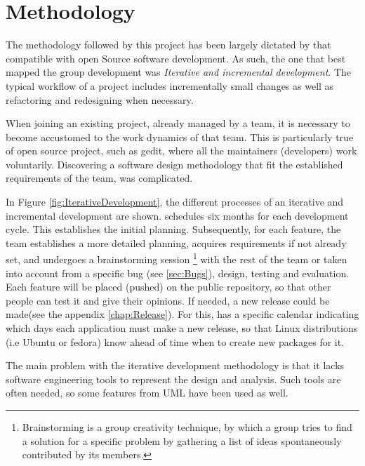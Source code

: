 \section{Methodology}\label{sec:Methodology}

The methodology followed by this project has been largely dictated by that compatible 
with open Source software development.    As such, the one that best mapped the group 
development was  \emph{Iterative and incremental development}. 
The typical workflow of a  \GNOME project includes incrementally small changes 
as well as refactoring and redesigning when necessary.  



When joining an existing project, already managed by a team, it is necessary to become accustomed 
to the work dynamics of that team. This is particularly true of open source project, such as gedit, 
where all the maintainers (developers) work voluntarily.  Discovering a software design methodology 
that fit the established requirements of the team, was complicated.  






In Figure \ref{fig:IterativeDevelopment}, the different processes of an iterative and incremental 
development are shown.  \GNOME schedules six months for each development cycle. This establishes the initial planning. 
Subsequently, for each feature, the team establishes a more detailed planning, acquires requirements if not already set, 
and undergoes a brainstorming session \footnote{Brainstorming is a group creativity technique, by which a group tries to find a 
solution for a specific problem by gathering a list of ideas spontaneously contributed by its members.} with the 
rest of the team or taken into account from a specific bug (see \ref{sec:Bugs}), design, testing and evaluation. 
Each feature will be placed (pushed) on the public repository,  so that other people can test it and give their opinions. 
If needed, a new release could be made(see the appendix \ref{chap:Release}).  For this, \GNOME has a specific calendar indicating 
which days each application must make a new release, so that Linux distributions (i.e Ubuntu or fedora) 
know ahead of time when to create new packages for it.

The main problem with the iterative development methodology is that it lacks software engineering tools 
to represent the design and analysis.  Such tools are often needed, so some features from UML have been used as well.





